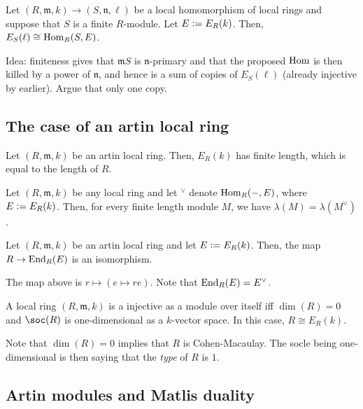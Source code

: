 \documentclass[12pt]{article}
\begin{document}
\begin{thm}
	Let $(R, \mathfrak{m}, k) \to (S, \mathfrak{n}, \ell)$ be a local homomorphism of local rings and suppose that $S$ is a finite $R$-module. Let $E \vcentcolon= E_{R}(k)$. Then, $E_{S}(\ell) \cong \operatorname{Hom}_{R}(S, E)$.
\end{thm}
Idea: finiteness gives that $\mathfrak{m}S$ is $\mathfrak{n}$-primary and that the proposed $\operatorname{Hom}$ is then killed by a power of $\mathfrak{n}$, and hence is a sum of copies of $E_{S}(\ell)$ (already injective by earlier). Argue that only one copy.

\subsection{The case of an artin local ring}

\begin{thm}
	Let $(R, \mathfrak{m}, k)$ be an artin local ring. Then, $E_{R}(k)$ has finite length, which is equal to the length of $R$.
\end{thm}

\begin{lem} 
	Let $(R, \mathfrak{m}, k)$ be any local ring and let $^{\vee}$ denote $\operatorname{Hom}_{R}(-, E)$, where $E \vcentcolon= E_{R}(k)$. Then, for every finite length module $M$, we have $\lambda(M) = \lambda(M^{\vee})$.
\end{lem}

\begin{thm}
	Let $(R, \mathfrak{m}, k)$ be an artin local ring and let $E \vcentcolon= E_{R}(k)$. Then, the map $R \to \operatorname{End}_{R}(E)$ is an isomorphism.
\end{thm}
The map above is $r \mapsto (e \mapsto re)$. Note that $\operatorname{End}_{R}(E) = E^{\vee}$.

\begin{thm} \label{thm:local-ring-self-injective}
	A local ring $(R, \mathfrak{m}, k)$ is a injective as a module over itself iff $\dim(R) = 0$ and $\soc(R)$ is one-dimensional as a $k$-vector space. In this case, $R \cong E_{R}(k)$.
\end{thm}
Note that $\dim(R) = 0$ implies that $R$ is Cohen-Macaulay. The socle being one-dimensional is then saying that the \emph{type} of $R$ is $1$.

\subsection{Artin modules and Matlis duality}
\end{document}
